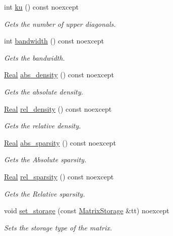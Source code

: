 \begin{DoxyCompactItemize}
int \hyperlink{classmtk_1_1Matrix_ab129068deb2892b194d2cda9aca989eb}{ku} () const noexcept
\begin{DoxyCompactList}\small\item\em Gets the number of upper diagonals. \end{DoxyCompactList}\item 
int \hyperlink{classmtk_1_1Matrix_a6ea9d49db9b0b57617377ed962c2a7e6}{bandwidth} () const noexcept
\begin{DoxyCompactList}\small\item\em Gets the bandwidth. \end{DoxyCompactList}\item 
\hyperlink{group__c01-roots_gac080bbbf5cbb5502c9f00405f894857d}{Real} \hyperlink{classmtk_1_1Matrix_a502171d5447dea0be99433d2e63bcfe5}{abs\+\_\+density} () const noexcept
\begin{DoxyCompactList}\small\item\em Gets the absolute density. \end{DoxyCompactList}\item 
\hyperlink{group__c01-roots_gac080bbbf5cbb5502c9f00405f894857d}{Real} \hyperlink{classmtk_1_1Matrix_ae8f0a5063f50e1cd21b601a482888358}{rel\+\_\+density} () const noexcept
\begin{DoxyCompactList}\small\item\em Gets the relative density. \end{DoxyCompactList}\item 
\hyperlink{group__c01-roots_gac080bbbf5cbb5502c9f00405f894857d}{Real} \hyperlink{classmtk_1_1Matrix_abf78ec78b23ee639c08fecbb80ca09e5}{abs\+\_\+sparsity} () const noexcept
\begin{DoxyCompactList}\small\item\em Gets the Absolute sparsity. \end{DoxyCompactList}\item 
\hyperlink{group__c01-roots_gac080bbbf5cbb5502c9f00405f894857d}{Real} \hyperlink{classmtk_1_1Matrix_a51d9fd51c6de964468bb9a0fde281498}{rel\+\_\+sparsity} () const noexcept
\begin{DoxyCompactList}\small\item\em Gets the Relative sparsity. \end{DoxyCompactList}\item 
void \hyperlink{classmtk_1_1Matrix_a111b89f2f21d06a59b8d043123bec625}{set\+\_\+storage} (const \hyperlink{group__c02-enums_ga25b67ec6a2afeee69f9bb196a9c66619}{Matrix\+Storage} \&tt) noexcept
\begin{DoxyCompactList}\small\item\em Sets the storage type of the matrix. \end{DoxyCompactList}\item 

\end{DoxyCompactItemize}

